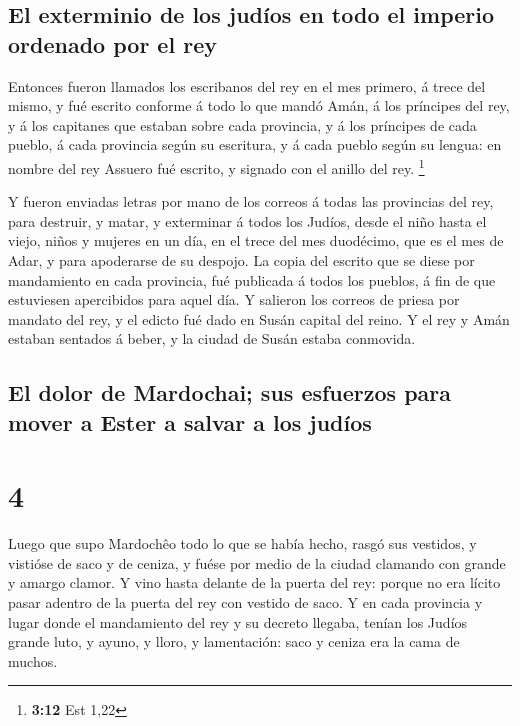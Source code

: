 \hypertarget{el-exterminio-de-los-juduxedos-en-todo-el-imperio-ordenado-por-el-rey}{%
\subsection{El exterminio de los judíos en todo el imperio ordenado por
el
rey}\label{el-exterminio-de-los-juduxedos-en-todo-el-imperio-ordenado-por-el-rey}}

 Entonces fueron llamados los escribanos del rey en el mes
primero, á trece del mismo, y fué escrito conforme á todo lo que mandó
Amán, á los príncipes del rey, y á los capitanes que estaban sobre cada
provincia, y á los príncipes de cada pueblo, á cada provincia según su
escritura, y á cada pueblo según su lengua: en nombre del rey Assuero
fué escrito, y signado con el anillo del rey. \footnote{\textbf{3:12}
  Est 1,22}

 Y fueron enviadas letras por mano de los correos á todas
las provincias del rey, para destruir, y matar, y exterminar á todos los
Judíos, desde el niño hasta el viejo, niños y mujeres en un día, en el
trece del mes duodécimo, que es el mes de Adar, y para apoderarse de su
despojo.  La copia del escrito que se diese por mandamiento
en cada provincia, fué publicada á todos los pueblos, á fin de que
estuviesen apercibidos para aquel día.  Y salieron los
correos de priesa por mandato del rey, y el edicto fué dado en Susán
capital del reino. Y el rey y Amán estaban sentados á beber, y la ciudad
de Susán estaba conmovida.

\hypertarget{el-dolor-de-mardochai-sus-esfuerzos-para-mover-a-ester-a-salvar-a-los-juduxedos}{%
\subsection{El dolor de Mardochai; sus esfuerzos para mover a Ester a
salvar a los
judíos}\label{el-dolor-de-mardochai-sus-esfuerzos-para-mover-a-ester-a-salvar-a-los-juduxedos}}

\hypertarget{section-3}{%
\section{4}\label{section-3}}

 Luego que supo Mardochêo todo lo que se había hecho, rasgó
sus vestidos, y vistióse de saco y de ceniza, y fuése por medio de la
ciudad clamando con grande y amargo clamor.  Y vino hasta
delante de la puerta del rey: porque no era lícito pasar adentro de la
puerta del rey con vestido de saco.  Y en cada provincia y
lugar donde el mandamiento del rey y su decreto llegaba, tenían los
Judíos grande luto, y ayuno, y lloro, y lamentación: saco y ceniza era
la cama de muchos.

